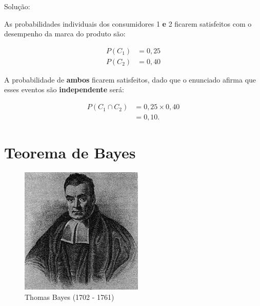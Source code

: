 \documentclass[
]{book}
\begin{document}
\hfill\break

Solução:

As probabilidades individuais dos consumidores 1 \textbf{e} 2 ficarem satisfeitos com o desempenho da marca do produto são:

\begin{align*}
P(C_{1}) & = 0,25\\
P(C_{2}) & = 0,40
\end{align*}

\hfill\break

A probabilidade de \textbf{ambos} ficarem satisfeitos, dado que o enunciado afirma que esses eventos são \textbf{independente} será:

\begin{align*}
P(C_{1} \cap C_{2}) & = 0,25 \times 0,40\\
                    & = 0,10.
\end{align*}

\hfill\break

\hypertarget{teorema-de-bayes}{%
\section{Teorema de Bayes}\label{teorema-de-bayes}}

\hfill\break

\begin{figure}

{\centering \includegraphics[width=0.8\linewidth]{images4/thomas_bayes} 

}

\caption{Thomas Bayes (1702 - 1761)}\label{fig:unnamed-chunk-72}
\end{figure}
\end{document}
